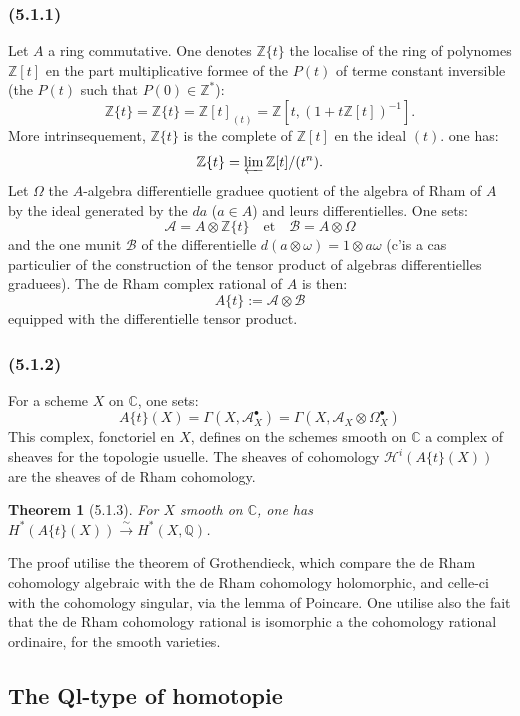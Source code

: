 \documentclass[12pt,a4paper]{article}
\theoremstyle{plain}
\newtheorem{theorem}{Theorem}[section]
\theoremstyle{definition}
\theoremstyle{remark}
\newcommand{\bbZ}{\mathbb{Z}}
\newcommand{\bbQ}{\mathbb{Q}}
\newcommand{\bbC}{\mathbb{C}}
\newcommand{\scrH}{\mathscr{H}}
\newcommand{\scrA}{\mathscr{A}}
\newcommand{\scrB}{\mathscr{B}}
\newcommand{\Zt}{\mathbb{Z}\{t\}}
\newcommand{\At}{A\{t\}}
\begin{document}
\subsubsection*{\textup{(5.1.1)}}

Let $A$ a ring commutative. One denotes $\Zt$ the localise of the ring of polynomes $\bbZ[t]$ en the part multiplicative formee of the $P(t)$ of terme constant inversible (the $P(t)$ such that $P(0) \in \bbZ^*$):
\[
\Zt = \bbZ\{t\} = \bbZ[t]_{(t)} = \bbZ[t, (1+t\bbZ[t])^{-1}].
\]
More intrinsequement, $\Zt$ is the complete of $\bbZ[t]$ en the ideal $(t)$. one has:
\[
\Zt = \varprojlim \bbZ[t]/(t^n).
\]
Let $\Omega$ the $A$-algebra differentielle graduee quotient of the algebra of Rham of $A$ by the ideal generated by the $da$ ($a \in A$) and leurs differentielles. One sets:
\[
\scrA = A \otimes \Zt \quad \text{et} \quad \scrB = A \otimes \Omega
\]
and the one munit $\scrB$ of the differentielle $d(a \otimes \omega) = 1 \otimes a\omega$ (c'is a cas particulier of the construction of the tensor product of algebras differentielles graduees). The de Rham complex rational of $A$ is then:
\[
\At := \scrA \otimes \scrB
\]
equipped with the differentielle tensor product.

\subsubsection*{\textup{(5.1.2)}}

For a scheme $X$ on $\bbC$, one sets:
\[
\At(X) = \Gamma(X, \scrA_X^\bullet) = \Gamma(X, \scrA_X \otimes \Omega_X^\bullet)
\]
This complex, fonctoriel en $X$, defines on the schemes smooth on $\bbC$ a complex of sheaves for the topologie usuelle. The sheaves of cohomology $\scrH^i(\At(X))$ are the sheaves of de Rham cohomology.

\begin{theorem}[5.1.3]
For $X$ smooth on $\bbC$, one has $H^*(\At(X)) \xrightarrow{\sim} H^*(X, \bbQ)$.
\end{theorem}

The proof utilise the theorem of Grothendieck, which compare the de Rham cohomology algebraic with the de Rham cohomology holomorphic, and celle-ci with the cohomology singular, via the lemma of Poincare. One utilise also the fait that the de Rham cohomology rational is isomorphic a the cohomology rational ordinaire, for the smooth varieties.

\subsection{The Ql-type of homotopie}
\end{document}
